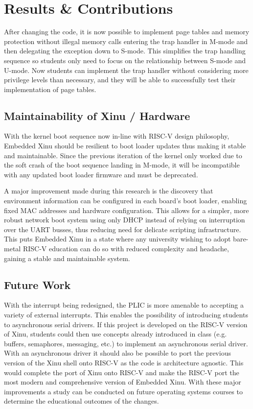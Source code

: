 \section{Results \& Contributions}

After changing the code, it is now possible to implement page tables and memory protection without illegal memory calls entering the trap handler in M-mode and then delegating the exception down to S-mode. This simplifies the trap handling sequence so students only need to focus on the relationship between S-mode and U-mode. Now students can implement the trap handler without considering more privilege levels than necessary, and they will be able to successfully test their implementation of page tables.

\subsection{Maintainability of Xinu / Hardware}

With the kernel boot sequence now in-line with RISC-V design philosophy, Embedded Xinu should be resilient to boot loader updates thus making it stable and maintainable. Since the previous iteration of the kernel only worked due to the soft crash of the boot sequence landing in M-mode, it will be incompatible with any updated boot loader firmware and must be deprecated.

A major improvement made during this research is the discovery that environment information can be configured in each board's boot loader, enabling fixed MAC addresses and hardware configuration. This allows for a simpler, more robust network boot system using only DHCP instead of relying on interruption over the UART busses, thus reducing need for delicate scripting infrastructure. This puts Embedded Xinu in a state where any university wishing to adopt bare-metal RISC-V education can do so with reduced complexity and headache, gaining a stable and maintainable system.

\subsection{Future Work}
With the interrupt being redesigned, the PLIC is more amenable to accepting a variety of external interrupts. This enables the possibility of introducing students to asynchronous serial drivers. If this project is developed on the RISC-V version of Xinu, students could then use concepts already introduced in class (e.g. buffers, semaphores, messaging, etc.) to implement an asynchronous serial driver. With an asynchronous driver it should also be possible to port the previous version of the Xinu shell onto RISC-V as the code is architecture agnostic. This would complete the port of Xinu onto RISC-V and make the RISC-V port the most modern and comprehensive version of Embedded Xinu. With these major improvements a study can be conducted on future operating systems courses to determine the educational outcomes of the changes.
